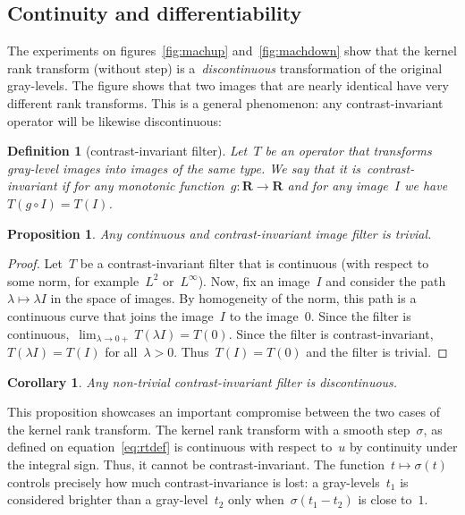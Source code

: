 \documentclass[12pt]{article}                  %
\newtheorem{definition}{Definition}
\newtheorem{proposition}{Proposition}
\newtheorem{corollary}{Corollary}
\begin{document}
\subsection{Continuity and differentiability}

The experiments on figures~\ref{fig:machup} and~\ref{fig:machdown} show that
the kernel rank transform (without step) is a~\emph{discontinuous}
transformation of the original gray-levels.  The figure shows that two
images that are nearly identical have very different rank transforms.  This
is a general phenomenon: any contrast-invariant operator will be likewise
discontinuous:

\begin{definition}[contrast-invariant filter]
	Let~$T$ be an operator that transforms gray-level images into images
	of the same type.  We say that it is~\emph{contrast-invariant} if
	for any
	monotonic function~$g:\mathbf{R}\to\mathbf{R}$ and for any image~$I$
	we have~$T(g\circ I)=T(I)$.
\end{definition}

\begin{proposition}
	Any continuous and contrast-invariant image filter is trivial.
\end{proposition}
\begin{proof}
	Let~$T$ be a contrast-invariant filter that is continuous (with
	respect to some norm, for example~$L^2$ or~$L^\infty$).
	Now, fix an image~$I$ and consider the
	path~$\lambda\mapsto \lambda I$ in the space of images.  By
	homogeneity of the norm, this path
	is a continuous curve that joins the image~$I$ to the image~$0$.
	Since the filter is continuous,~$\displaystyle\lim_{\lambda\to
	0+}T(\lambda I)=T(0)$.
	Since the filter is contrast-invariant,~$T(\lambda I)=T(I)$
	for all~$\lambda>0$.
	Thus~$T(I)=T(0)$ and the filter is trivial.
\end{proof}

\begin{corollary}
	Any non-trivial contrast-invariant filter is discontinuous.
\end{corollary}

This proposition showcases an important compromise between the two cases of
the kernel rank transform.
The kernel rank transform with a smooth step~$\sigma$, as defined on
equation~\ref{eq:rtdef} is continuous with respect to~$u$ by continuity
under the integral sign.  Thus, it cannot be contrast-invariant.  The
function~$t\mapsto\sigma(t)$ controls precisely how much contrast-invariance
is lost: a gray-levels~$t_1$ is considered brighter than a gray-level~$t_2$
only when~$\sigma(t_1-t_2)$ is close to~$1$.
\end{document}
